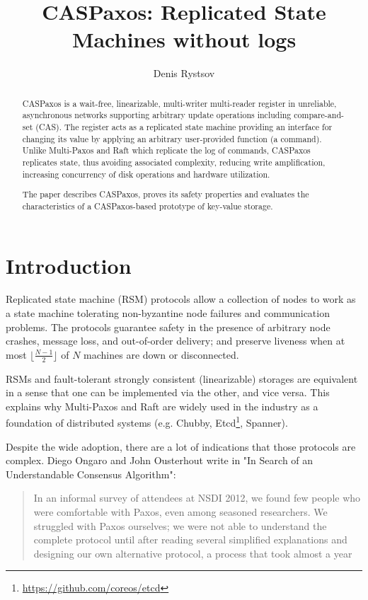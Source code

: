 \documentclass[a4paper,USenglish]{lipics-v2018}
\title{CASPaxos: Replicated State Machines without logs}
\author{Denis Rystsov}{Microsoft}{derystso@microsoft.com}{}{}
\theoremstyle{definition}
\begin{document}
\maketitle

\begin{abstract}
    CASPaxos is a wait-free, linearizable, multi-writer multi-reader register in unreliable, asynchronous networks supporting arbitrary update operations including compare-and-set (CAS). The register acts as a replicated state machine providing an interface for changing its value by applying an arbitrary user-provided function (a command). Unlike Multi-Paxos and Raft which replicate the log of commands, CASPaxos replicates state, thus avoiding associated complexity, reducing write amplification, increasing concurrency of disk operations and hardware utilization.

    The paper describes CASPaxos, proves its safety properties and evaluates the characteristics of a CASPaxos-based prototype of key-value storage.
\end{abstract}

\section{Introduction}

Replicated state machine (RSM) protocols allow a collection of nodes to work as a state machine tolerating non-byzantine node failures and communication problems. The protocols guarantee safety in the presence of arbitrary node crashes, message loss, and out-of-order delivery; and preserve liveness when at most $\lfloor \frac{N-1}2 \rfloor$ of $N$ machines are down or disconnected.

RSMs and fault-tolerant strongly consistent (linearizable) storages are equivalent in a sense that one can be implemented via the other, and vice versa. This explains why Multi-Paxos\cite{lamport01} and Raft\cite{raft} are widely used in the industry as a foundation of distributed systems (e.g. Chubby\cite{chubby}, Etcd\footnote{\href{https://github.com/coreos/etcd}{https://github.com/coreos/etcd}}, Spanner\cite{spanner}).

Despite the wide adoption, there are a lot of indications that those protocols are complex. Diego Ongaro and John Ousterhout write in "In Search of an Understandable Consensus Algorithm"\cite{raft}:

\begin{quote}
    In an informal survey of attendees at NSDI 2012, we found few people who were comfortable with Paxos, even among seasoned researchers. We struggled with Paxos ourselves; we were not able to understand the complete protocol until after reading several simplified explanations and designing our own alternative protocol, a process that took almost a year
\end{quote}
\end{document}
